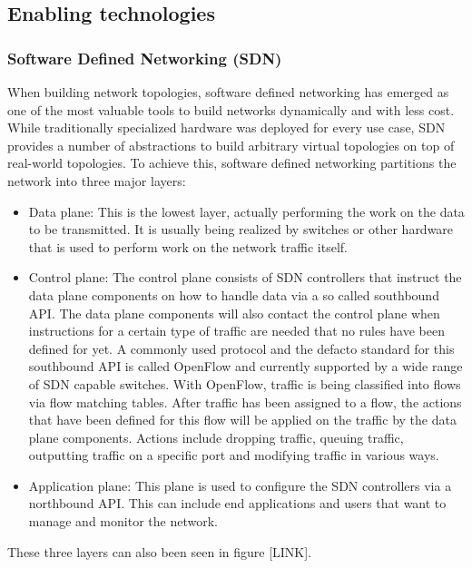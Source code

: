 \documentclass{article}
\begin{document}
\subsection{Enabling technologies}
\subsubsection{Software Defined Networking (SDN)}
When building network topologies, software defined networking \cite{sdn} has emerged as one of the most valuable tools to build networks dynamically and with less cost. While traditionally specialized hardware was deployed for every use case, SDN provides a number of abstractions to build arbitrary virtual topologies on top of real-world topologies. To achieve this, software defined networking partitions the network into three major layers:
\begin{itemize}
    \item Data plane: This is the lowest layer, actually performing the work on the data to be transmitted. It is usually being realized by switches or other hardware that is used to perform work on the network traffic itself.
    \item Control plane: The control plane consists of SDN controllers that instruct the data plane components on how to handle data via a so called southbound API. The data plane components will also contact the control plane when instructions for a certain type of traffic are needed that no rules have been defined for yet. A commonly used protocol and the defacto standard for this southbound API is called OpenFlow \cite{openflow} and currently supported by a wide range of SDN capable switches. With OpenFlow, traffic is being classified into flows via flow matching tables. After traffic has been assigned to a flow, the actions that have been defined for this flow will be applied on the traffic by the data plane components. Actions include dropping traffic, queuing traffic, outputting traffic on a specific port and modifying traffic in various ways.
    \item Application plane: This plane is used to configure the SDN controllers via a northbound API. This can include end applications and users that want to manage and monitor the network.
\end{itemize}
These three layers can also been seen in figure [LINK]. %
\end{document}
